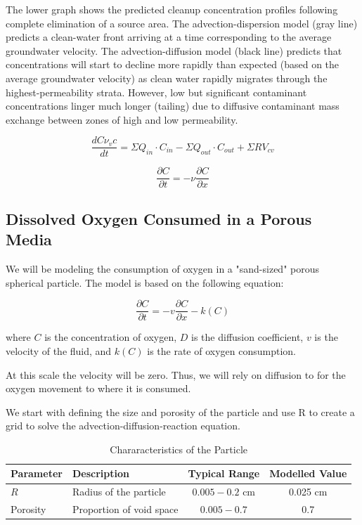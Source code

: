 \documentclass{tufte-handout}\usepackage[]{graphicx}\usepackage[]{xcolor}
\begin{document}
The lower graph shows the predicted cleanup concentration profiles following complete elimination of a source area. The advection-dispersion model (gray line) predicts a clean-water front arriving at a time corresponding to the average groundwater velocity. The advection-diffusion model (black line) predicts that concentrations will start to decline more rapidly than expected (based on the average groundwater velocity) as clean water rapidly migrates through the highest-permeability strata. However, low but significant contaminant concentrations linger much longer (tailing) due to diffusive contaminant mass exchange between zones of high and low permeability.

\begin{equation}
\frac{d C\nu_vc}{d t} = \Sigma Q_{in} \cdot C_{in} - \Sigma Q_{out} \cdot C_{out} + \Sigma R V_{cv}
\end{equation}


\begin{equation}
  \frac{\partial C}{\partial t} = - \nu \frac{\partial C}{\partial x}
\end{equation}


\subsection{Dissolved Oxygen Consumed in a Porous Media}

We will be modeling the consumption of oxygen in a "sand-sized" porous spherical particle. The model is based on the following equation:

\[ \frac{\partial C}{\partial t} = -v \frac{\partial C}{\partial x} - k(C) \]

where \( C \) is the concentration of oxygen, \( D \) is the diffusion coefficient, \( v \) is the velocity of the fluid, and \( k(C) \) is the rate of oxygen consumption.

At this scale the velocity will be zero. Thus, we will rely on diffusion to for the oxygen movement to where it is consumed. 



We start with defining the size and porosity of the particle and use R to create a grid to solve the advection-diffusion-reaction equation.

\begin{table}
\caption{Chararacteristics of the Particle}
\centering
\begin{tabular}{|l|l|c|c|} \hline
Parameter & Description & Typical Range &  Modelled Value \\ \hline\hline
\( R \) & Radius of the particle & \( 0.005-0.2 \) cm &  0.025 cm \\
Porosity & Proportion of void space & \(0.005-0.7\) &  0.7 \\ \hline
\end{tabular}
\end{table}
\end{document}
